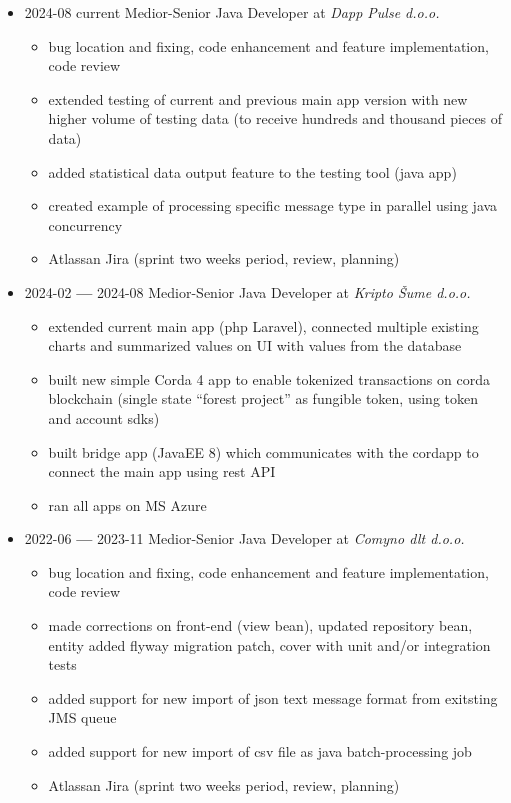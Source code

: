 \documentclass[12pt]{article}
\begin{document}
\begin{itemize}
    \setlength\itemsep{-0.3em}
    \item 2024-08 current Medior-Senior Java Developer at \textit{Dapp Pulse d.o.o.}
        \begin{itemize}
            \setlength\itemsep{-0.3em}
            \item bug location and fixing, code enhancement and feature implementation, code review
            \item extended testing of current and previous main app version with new higher volume of testing data (to receive hundreds and thousand pieces of data)
            \item added statistical data output feature to the testing tool (java app)
            \item created example of processing specific message type in parallel using java concurrency
            \item Atlassan Jira (sprint two weeks period, review, planning)
        \end{itemize}
    \item 2024-02 \textbf{---} 2024-08 Medior-Senior Java Developer at \textit{Kripto Šume d.o.o.}
        \begin{itemize}
            \setlength\itemsep{-0.3em}
            \item extended current main app (php Laravel), connected multiple existing charts and summarized values on UI with values from the database
            \item built new simple Corda 4 app to enable tokenized transactions on corda blockchain (single state “forest project” as fungible token, using token and account sdks)
            \item built bridge app (JavaEE 8) which communicates with the cordapp to connect the main app using rest API
            \item ran all apps on MS Azure
        \end{itemize}
    \item 2022-06 \textbf{---} 2023-11 Medior-Senior Java Developer at \textit{Comyno dlt d.o.o.}
        \begin{itemize}
            \setlength\itemsep{-0.3em}
            \item bug location and fixing, code enhancement and feature implementation, code review
            \item made corrections on front-end (view bean), updated repository bean, entity added flyway migration patch, cover with unit and/or integration tests 
            \item added support for new import of json text message format from exitsting JMS queue 
            \item added support for new import of csv file as java batch-processing job
            \item Atlassan Jira (sprint two weeks period, review, planning)
        \end{itemize}


\end{itemize}
\end{document}
